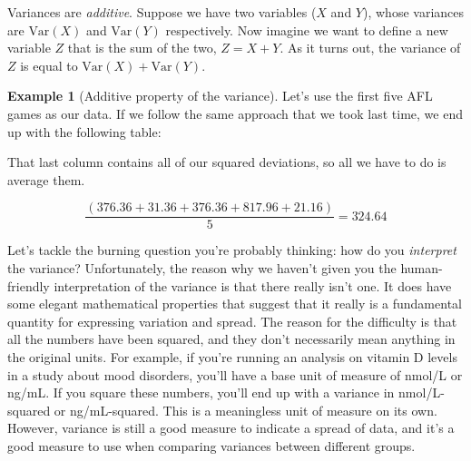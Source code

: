 \documentclass[
]{book}
\theoremstyle{definition}
\theoremstyle{definition}
\newtheorem{example}{Example}[chapter]
\theoremstyle{definition}
\theoremstyle{definition}
\theoremstyle{remark}
\begin{document}
Variances are \emph{additive}. Suppose we have two variables (\(X\) and \(Y\)), whose variances are \(\mbox{Var}(X)\) and \(\mbox{Var}(Y)\) respectively. Now imagine we want to define a new variable \(Z\) that is the sum of the two, \(Z = X+Y\). As it turns out, the variance of \(Z\) is equal to \(\mbox{Var}(X) + \mbox{Var}(Y)\).

\begin{example}[Additive property of the variance]
\protect\hypertarget{exm:exVarAddit}{}\label{exm:exVarAddit}Let's use the first five AFL games as our data. If we follow the same approach that we took last time, we end up with the following table:

\begin{table}[H]
\centering
{}
\end{table}

That last column contains all of our squared deviations, so all we have to do is average them.

\[
\frac{( 376.36 + 31.36 + 376.36 + 817.96 + 21.16 )}{5} = 324.64
\]
\end{example}

Let's tackle the burning question you're probably thinking: how do you \emph{interpret} the variance? Unfortunately, the reason why we haven't given you the human-friendly interpretation of the variance is that there really isn't one. It does have some elegant mathematical properties that suggest that it really is a fundamental quantity for expressing variation and spread. The reason for the difficulty is that all the numbers have been squared, and they don't necessarily mean anything in the original units. For example, if you're running an analysis on vitamin D levels in a study about mood disorders, you'll have a base unit of measure of nmol/L or ng/mL. If you square these numbers, you'll end up with a variance in nmol/L-squared or ng/mL-squared. This is a meaningless unit of measure on its own. However, variance is still a good measure to indicate a spread of data, and it's a good measure to use when comparing variances between different groups.
\end{document}
